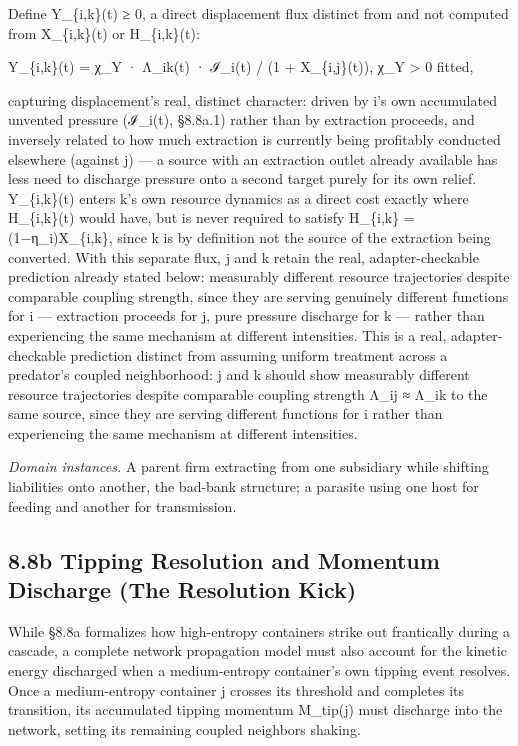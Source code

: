\documentclass[
]{article}
\begin{document}
Define Y\_\{i,k\}(t) ≥ 0, a direct displacement flux distinct from and
not computed from X\_\{i,k\}(t) or H\_\{i,k\}(t):

Y\_\{i,k\}(t) = χ\_Y · Λ\_ik(t) · ℐ\_i(t) / (1 + X\_\{i,j\}(t)), χ\_Y
\textgreater{} 0 fitted,

capturing displacement's real, distinct character: driven by i's own
accumulated unvented pressure (ℐ\_i(t), §8.8a.1) rather than by
extraction proceeds, and inversely related to how much extraction is
currently being profitably conducted elsewhere (against j) --- a source
with an extraction outlet already available has less need to discharge
pressure onto a second target purely for its own relief. Y\_\{i,k\}(t)
enters k's own resource dynamics as a direct cost exactly where
H\_\{i,k\}(t) would have, but is never required to satisfy H\_\{i,k\} =
(1−η\_i)X\_\{i,k\}, since k is by definition not the source of the
extraction being converted. With this separate flux, j and k retain the
real, adapter-checkable prediction already stated below: measurably
different resource trajectories despite comparable coupling strength,
since they are serving genuinely different functions for i ---
extraction proceeds for j, pure pressure discharge for k --- rather than
experiencing the same mechanism at different intensities. This is a
real, adapter-checkable prediction distinct from assuming uniform
treatment across a predator's coupled neighborhood: j and k should show
measurably different resource trajectories despite comparable coupling
strength Λ\_ij ≈ Λ\_ik to the same source, since they are serving
different functions for i rather than experiencing the same mechanism at
different intensities.

\emph{Domain instances.} A parent firm extracting from one subsidiary
while shifting liabilities onto another, the bad-bank structure; a
parasite using one host for feeding and another for transmission.

\hypertarget{b-tipping-resolution-and-momentum-discharge-the-resolution-kick}{%
\subsection{8.8b Tipping Resolution and Momentum Discharge (The
Resolution
Kick)}\label{b-tipping-resolution-and-momentum-discharge-the-resolution-kick}}

While §8.8a formalizes how high-entropy containers strike out
frantically during a cascade, a complete network propagation model must
also account for the kinetic energy discharged when a medium-entropy
container's own tipping event resolves. Once a medium-entropy container
j crosses its threshold and completes its transition, its accumulated
tipping momentum M\_tip(j) must discharge into the network, setting its
remaining coupled neighbors shaking.
\end{document}
